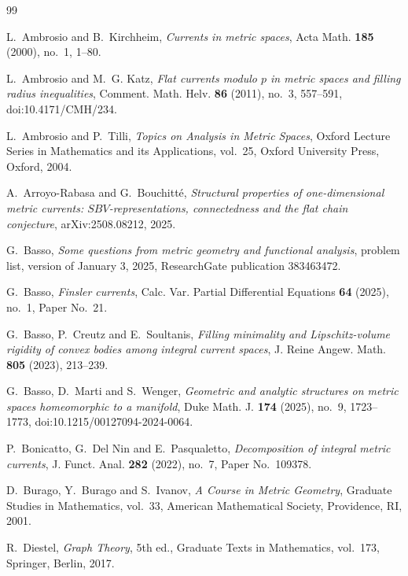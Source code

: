 \documentclass[11pt]{article}
\theoremstyle{remark}
\begin{document}
\begin{thebibliography}{99}

L.~Ambrosio and B.~Kirchheim,
\emph{Currents in metric spaces},
Acta Math. \textbf{185} (2000), no.~1, 1--80.

L.~Ambrosio and M.~G. Katz,
\emph{Flat currents modulo $p$ in metric spaces and filling radius inequalities},
Comment. Math. Helv. \textbf{86} (2011), no.~3, 557--591, doi:10.4171/CMH/234.

L.~Ambrosio and P.~Tilli,
\emph{Topics on Analysis in Metric Spaces},
Oxford Lecture Series in Mathematics and its Applications, vol.~25,
Oxford University Press, Oxford, 2004.

A.~Arroyo-Rabasa and G.~Bouchitt\'e,
\emph{Structural properties of one-dimensional metric currents:
$SBV$-representations, connectedness and the flat chain conjecture},
arXiv:2508.08212, 2025.

G.~Basso,
\emph{Some questions from metric geometry and functional analysis},
problem list, version of January 3, 2025, ResearchGate publication 383463472.

G.~Basso,
\emph{Finsler currents},
Calc. Var. Partial Differential Equations \textbf{64} (2025), no.~1, Paper No.~21.

G.~Basso, P.~Creutz and E.~Soultanis,
\emph{Filling minimality and Lipschitz-volume rigidity of convex bodies among integral current spaces},
J. Reine Angew. Math. \textbf{805} (2023), 213--239.

G.~Basso, D.~Marti and S.~Wenger,
\emph{Geometric and analytic structures on metric spaces homeomorphic to a manifold},
Duke Math. J. \textbf{174} (2025), no.~9, 1723--1773,
doi:10.1215/00127094-2024-0064.

P.~Bonicatto, G.~Del Nin and E.~Pasqualetto,
\emph{Decomposition of integral metric currents},
J. Funct. Anal. \textbf{282} (2022), no.~7, Paper No.~109378.

D.~Burago, Y.~Burago and S.~Ivanov,
\emph{A Course in Metric Geometry},
Graduate Studies in Mathematics, vol.~33, American Mathematical Society, Providence, RI, 2001.

R.~Diestel,
\emph{Graph Theory},
5th ed., Graduate Texts in Mathematics, vol.~173, Springer, Berlin, 2017.


\end{thebibliography}
\end{document}

